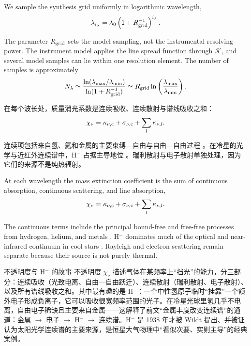 \begin{EN}
We sample the synthesis grid uniformly in logarithmic wavelength,
\begin{equation}
\lambda_{i_\lambda} =
\lambda_0\left(1+R_{\rm grid}^{-1}\right)^{i_\lambda} .
\end{equation}

\noindent The parameter $R_{\rm grid}$ sets the model sampling, not the instrumental
resolving power. The instrument model applies the line spread function through
$\mathcal{K}$, and several model samples can lie within one resolution element.
The number of samples is approximately
\begin{equation}
N_\lambda \simeq
\frac{\ln(\lambda_{\max}/\lambda_{\min})}
     {\ln(1+R_{\rm grid}^{-1})}
\simeq R_{\rm grid}\ln\left(\frac{\lambda_{\max}}{\lambda_{\min}}\right).
\end{equation}
\end{EN}

在每个波长处，质量消光系数是连续吸收、连续散射与谱线吸收之和：
\begin{equation}
\chi_\nu = \kappa_{\nu,{\rm c}} + \sigma_{\nu,{\rm c}}
          + \sum_l \kappa_{\nu,l} .
\end{equation}

\noindent 连续项包括来自氢、氦和金属的主要束缚—自由与自由—自由过程 \citep{Mihalas1978,Gray2005}。在冷星的光学与近红外连续谱中，H$^-$ 占据主导地位 \citep{John1988}。瑞利散射与电子散射单独处理，因为它们的来源不是纯热辐射。

\begin{EN}
At each wavelength the mass extinction coefficient is the sum of continuous
absorption, continuous scattering, and line absorption,
\begin{equation}
\chi_\nu = \kappa_{\nu,{\rm c}} + \sigma_{\nu,{\rm c}}
          + \sum_l \kappa_{\nu,l} .
\end{equation}

\noindent The continuous terms include the principal bound-free and free-free
processes from hydrogen, helium, and metals \citep{Mihalas1978,Gray2005}.
H$^-$ dominates much of the optical and near-infrared continuum in cool stars
\citep{John1988}. Rayleigh and electron scattering remain separate because
their source is not purely thermal.
\end{EN}

\begin{physbox}{不透明度与 H$^-$ 的故事}
不透明度 $\chi_\nu$ 描述气体在某频率上“挡光”的能力，分三部分：连续吸收（光致电离、自由—自由跃迁）、连续散射（瑞利散射、电子散射）、以及所有谱线吸收之和。其中最有趣的是 H$^-$：一个中性氢原子临时“挂靠”一个额外电子形成负离子，它可以吸收很宽频率范围的光子。在冷星光球里氢几乎不电离，自由电子稀缺且主要来自金属——这解释了前文“金属丰度改变连续谱”的通道：金属 $\rightarrow$ 电子 $\rightarrow$ H$^-$ $\rightarrow$ 连续谱。H$^-$ 是 1938 年才被 Wildt 提出、并被证认为太阳光学连续谱的主要来源，是恒星大气物理中“看似次要、实则主导”的经典案例。
\end{physbox}

